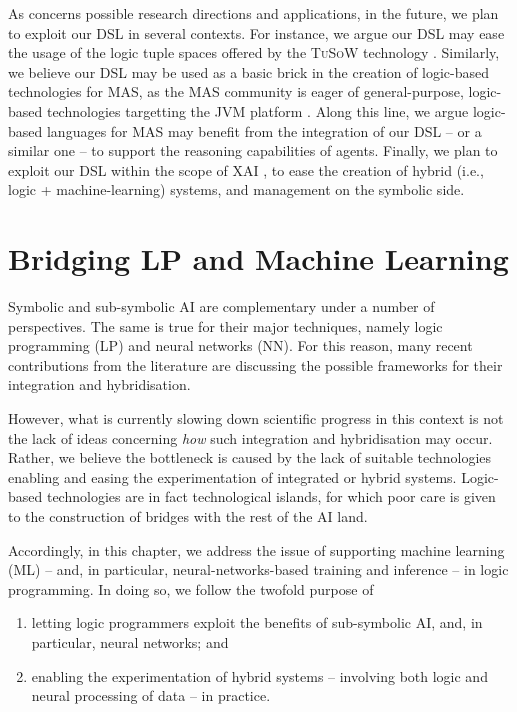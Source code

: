 \documentclass[12pt,a4paper,openright,twoside]{book}
\begin{document}
As concerns possible research directions and applications, in the future, we plan to exploit our DSL in several contexts.
%
For instance, we argue our DSL may ease the usage of the logic tuple spaces offered by the \textsc{TuSoW} technology \cite{tusow-icccn2019}.
%
Similarly, we believe our DSL may be used as a basic brick in the creation of logic-based technologies for MAS, as the MAS community is eager of general-purpose, logic-based technologies targetting the JVM platform \cite{lptech4mas-jaamas35}.
%
Along this line, we argue logic-based languages for MAS may benefit from the integration of our DSL -- or a similar one -- to support the reasoning capabilities of agents.
%
Finally, we plan to exploit our DSL within the scope of XAI \cite{xaisurvey-ia14}, to ease the creation of hybrid (i.e., logic + machine-learning) systems, and management on the symbolic side.


\chapter{Bridging LP and Machine Learning}
\label{chap:mllib}


Symbolic and sub-symbolic AI are complementary under a number of perspectives.
%
The same is true for their major techniques, namely logic programming (LP) and neural networks (NN).
%
For this reason, many recent contributions from the literature are discussing the possible frameworks for their integration and hybridisation.

However, what is currently slowing down scientific progress in this context is not the lack of ideas concerning \emph{how} such integration and hybridisation may occur.
%
Rather, we believe the bottleneck is caused by the lack of suitable technologies enabling and easing the experimentation of integrated or hybrid systems.
%
Logic-based technologies are in fact technological islands, for which poor care is given to the construction of bridges with the rest of the AI land.

Accordingly, in this chapter, we address the issue of supporting machine learning (ML) -- and, in particular, neural-networks-based training and inference -- in logic programming.
%
In doing so, we follow the twofold purpose of
%
\begin{enumerate}
    \item letting logic programmers exploit the benefits of sub-symbolic AI, and, in particular, neural networks; and
    \item enabling the experimentation of hybrid systems -- involving both logic and neural processing of data -- in practice.
\end{enumerate}
\end{document}
